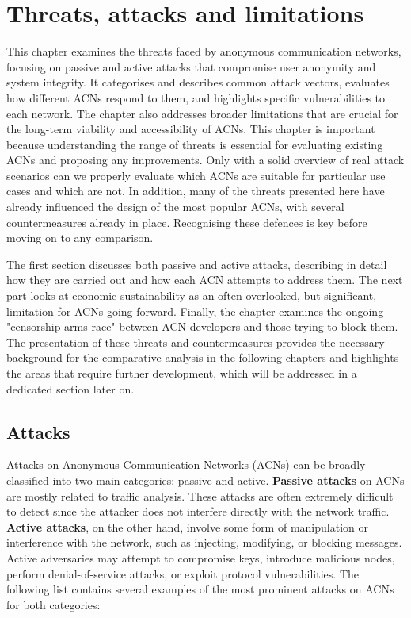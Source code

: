 \chapter{Threats, attacks and limitations}
\label{chap:Threats}

This chapter examines the threats faced by anonymous communication networks, focusing on passive and active attacks that compromise user anonymity and system integrity. It categorises and describes common attack vectors, evaluates how different ACNs respond to them, and highlights specific vulnerabilities to each network. The chapter also addresses broader limitations that are crucial for the long-term viability and accessibility of ACNs.
This chapter is important because understanding the range of threats is essential for evaluating existing ACNs and proposing any improvements. Only with a solid overview of real attack scenarios can we properly evaluate which ACNs are suitable for particular use cases and which are not. In addition, many of the threats presented here have already influenced the design of the most popular ACNs, with several countermeasures already in place. Recognising these defences is key before moving on to any comparison.

The first section discusses both passive and active attacks, describing in detail how they are carried out and how each ACN attempts to address them. The next part looks at economic sustainability as an often overlooked, but significant, limitation for ACNs going forward. Finally, the chapter examines the ongoing "censorship arms race" between ACN developers and those trying to block them. The presentation of these threats and countermeasures provides the necessary background for the comparative analysis in the following chapters and highlights the areas that require further development, which will be addressed in a dedicated section later on.

\section{Attacks}

Attacks on Anonymous Communication Networks (ACNs) can be broadly classified into two main categories: passive and active. \textbf{Passive attacks} on ACNs are mostly related to traffic analysis. These attacks are often extremely difficult to detect since the attacker does not interfere directly with the network traffic. \textbf{Active attacks}, on the other hand, involve some form of manipulation or interference with the network, such as injecting, modifying, or blocking messages. Active adversaries may attempt to compromise keys, introduce malicious nodes, perform denial-of-service attacks, or exploit protocol vulnerabilities. The following list contains several examples of the most prominent attacks on ACNs for both categories:

